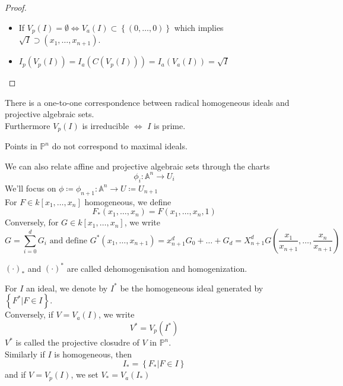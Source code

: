 \documentclass[../main.tex]{subfiles}
\begin{document}
\begin{proof}
\begin{itemize}
\item If $V_p( I) = \emptyset\iff V_a( I) \subset \left\{ ( 0,\ldots,0)  \right\} $ which implies $\sqrt{I} \supset ( x_1,\ldots,x_{n+1} ) $.\\
\item $I_p( V_p( I) ) = I_a( C( V_p( I) ) ) = I_a( V_a( I) ) = \sqrt{I} $ 
\end{itemize}

\end{proof}
\begin{crly}
There is a one-to-one correspondence between radical homogeneous ideals and projective algebraic sets.\\
Furthermore $V_p( I) $ is irreducible $\iff$ $I$ is prime.
\end{crly}
\begin{rmq}
Points in $\mathbb{P}^{n}$ do not correspond to maximal ideals.
\end{rmq}
We can also relate affine and projective algebraic sets through the charts
\[ 
\phi_i : \mathbb{A}^{n}\to U_i
\]
We'll focus on $\phi \coloneqq \phi_{n+1} : \mathbb{A}^{n}\to U \coloneqq U_{n+1} 	$ \\
For $F\in k[x_1,\ldots,x_n]$ homogeneous, we define
\[ 
F_*( x_1,\ldots,x_n) = F( x_1,\ldots,x_n,1) 
\]
Conversely, for $ G\in k[x_1,\ldots,x_n]$, we write
\[ 
G= \sum_{i=0}^{ d} G_i \text{ and define } G^{*}( x_1,\ldots,x_{n+1} ) = x_{n+1}^{ d}G_0+ \ldots + G_d= X_{n+1}^{d}G( \frac{x_1}{x_{n+1} },\ldots, \frac{x_n}{x_{n+1} }) 	
\]
\begin{defn}[Homogenization]
	$( \cdot)_{*} $ and $ ( \cdot)^{*}$ are called dehomogenisation and homogenization.
\end{defn}
For $I$ an ideal, we denote by $I^{*}$ be the homogeneous ideal generated by $\left\{ F^{*}|F\in I \right\} $.\\
Conversely, if $V= V_a( I) $, we write
\[ 
V^{*}= V_p( I^{*}) 
\]
$V^{*}$ is called the projective closudre of $V$ in $ \mathbb{P}^{n}$.\\
Similarly if $I$ is homogeneous, then
\[ 
I_{*} = \left\{ F_*| F\in I \right\} 
\]
and if $V= V_p( I) $, we set $V_* = V_a( I_*) $ 	
\end{document}
